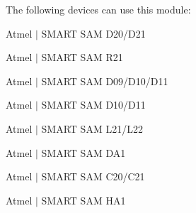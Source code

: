 The following devices can use this module\+:
\begin{DoxyItemize}
\item Atmel $\vert$ S\+M\+A\+RT S\+AM D20/\+D21
\item Atmel $\vert$ S\+M\+A\+RT S\+AM R21
\item Atmel $\vert$ S\+M\+A\+RT S\+AM D09/\+D10/\+D11
\item Atmel $\vert$ S\+M\+A\+RT S\+AM D10/\+D11
\item Atmel $\vert$ S\+M\+A\+RT S\+AM L21/\+L22
\item Atmel $\vert$ S\+M\+A\+RT S\+AM D\+A1
\item Atmel $\vert$ S\+M\+A\+RT S\+AM C20/\+C21
\item Atmel $\vert$ S\+M\+A\+RT S\+AM H\+A1
\end{DoxyItemize}

